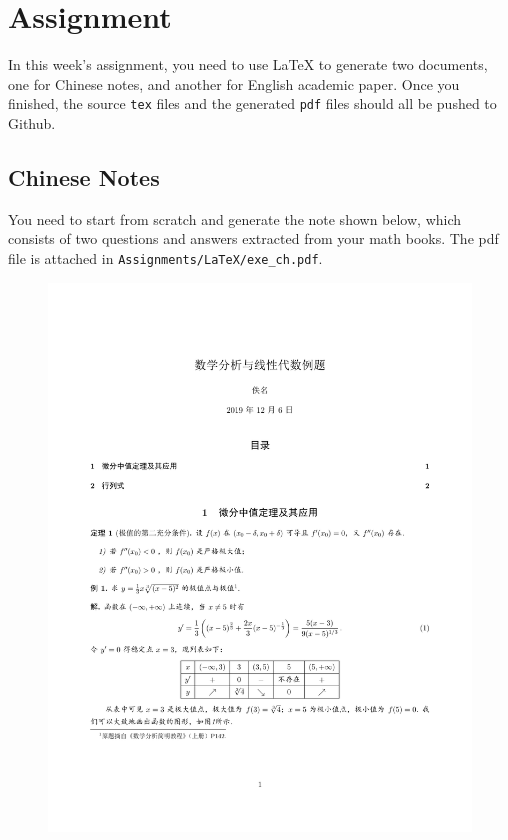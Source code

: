 \documentclass[english]{../TexTemplate/thesis}
\begin{document}
\newpage
\section{Assignment}
In this week's assignment, you need to use \LaTeX{} to generate two documents, one for Chinese notes, and another for English academic paper.
Once you finished, the source \verb'tex' files and the generated \verb'pdf' files should all be pushed to Github.

\subsection{Chinese Notes}
You need to start from scratch and generate the note shown below, which consists of two questions and answers extracted from your math books.
The pdf file is attached in \verb'Assignments/LaTeX/exe_ch.pdf'.
\begin{figure}[H]
\centering
\includegraphics[width=0.7\linewidth]{../Assignments/LaTeX/exe_ch.pdf}
\end{figure}
\end{document}
